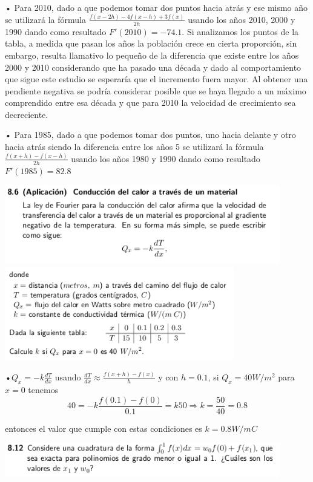 \documentclass[11pt]{article}
\begin{document}
• Para 2010, dado a que podemos tomar dos puntos hacia atrás y ese mismo año se utilizará la fórmula  $\frac{f(x - 2h)  -4f(x - h) + 3f(x)}{2h}$ usando los años 2010, 2000 y 1990 dando como resultado $F'(2010) = -74.1 $. Si analizamos los puntos de la tabla, a medida que pasan los años la población crece en cierta proporción, sin embargo, resulta llamativo lo pequeño de la diferencia que existe entre los años 2000 y 2010 considerando que ha pasado una década y dado al comportamiento que sigue este estudio se esperaría que el incremento fuera mayor. Al obtener una pendiente negativa se podría considerar posible que se haya llegado a un máximo comprendido entre esa década y que para 2010 la velocidad de crecimiento sea decreciente.

• Para 1985, dado a que podemos tomar dos puntos, uno hacia delante y otro hacia atrás siendo  la diferencia entre los años 5 se utilizará la fórmula  $\frac{f(x + h) − f(x - h)}{2h}$ usando los años 1980 y 1990 dando como resultado $F'(1985) = 82.8$

\begin{center}
    \includegraphics[keepaspectratio, width=12cm]{8.6.png}
    \includegraphics[keepaspectratio, width=10cm]{8.62.png}
\end{center} 

•$Q_x = -k \frac{dT}{dx}$
usando $ \frac{dT}{dx} \approx \frac{f(x + h) - f(x)}{h}$ y con $h = 0.1$, si $Q_x = 40 W/m^2$ para $x=0$ tenemos
$$40 = -k\frac{f(0.1) - f(0)}{0.1} = k50 \Rightarrow  k = \frac{50}{40} = 0.8$$

entonces el valor que cumple con estas condiciones es $k = 0.8 W/mC$

\begin{center}
    \includegraphics[keepaspectratio, width=12cm]{8.12.png}
    \caption{\\}
\end{center} 
\end{document}
